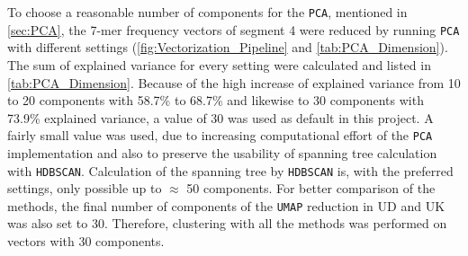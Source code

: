 \vspace{1em}

To choose a reasonable number of components for the \texttt{PCA}, mentioned in \autoref{sec:PCA}, the 7-mer frequency vectors of segment 4 were reduced by running \texttt{PCA} with different settings (\autoref{fig:Vectorization_Pipeline} and \autoref{tab:PCA_Dimension}). The sum of explained variance for every setting were calculated and listed in \autoref{tab:PCA_Dimension}. Because of the high increase of explained variance from 10 to 20 components with 58.7\% to 68.7\% and likewise to 30 components with 73.9\% explained variance, a value of 30 was used as default in this project. A fairly small value was used, due to increasing computational effort of the \texttt{PCA} implementation and also to preserve the usability of spanning tree calculation with \texttt{HDBSCAN}. Calculation of the spanning tree by \texttt{HDBSCAN} is, with the preferred settings, only possible up to $\approx$ 50 components. For better comparison of the methods, the final number of components of the \texttt{UMAP} reduction in UD and UK was also set to 30. Therefore, clustering with all the methods was performed on vectors with 30 components.

\begin{table}[!hbt]
    \centering
    \caption[Explained variance by different PCA settings]{\textbf{Explained variance by different PCA settings.} The explained variance of specific \texttt{PCA} component settings used on the 7-mer frequency vectors of segment 4. A result of 0.587, as for extracted 10 components, represents 58.7\% of the variance explained by the first 10 components of the vector. The more components were extracted the lower the increase in additional explained variance \autocite{pearson_liii_1901}.}
    \label{tab:PCA_Dimension}
\end{table}

